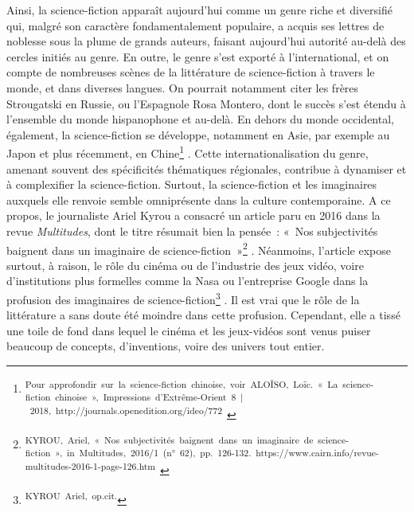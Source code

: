 \documentclass[letterpaper,portrait,12pt]{article}
\begin{document}
	Ainsi, la science-fiction appara\^{i}t aujourd'hui comme un genre riche et diversifi\'{e} qui, malgr\'{e} son caract\`{e}re fondamentalement populaire, a acquis ses lettres de noblesse sous la plume de grands auteurs, faisant aujourd'hui autorit\'{e} au-del\`{a} des cercles initi\'{e}s au genre. En outre, le genre s'est export\'{e} \`{a} l'international, et on compte de nombreuses sc\`{e}nes de la litt\'{e}rature de science-fiction \`{a} travers le monde, et dans diverses langues. On pourrait notamment citer les fr\`{e}res Strougatski en Russie, ou l'Espagnole Rosa Montero, dont le succ\`{e}s s'est \'{e}tendu \`{a} l'ensemble du monde hispanophone et au-del\`{a}. En dehors du monde occidental, \'{e}galement, la science-fiction se d\'{e}veloppe, notamment en Asie, par exemple au Japon et plus r\'{e}cemment, en Chine\footnote{\textsuperscript{\newpage
}\textsuperscript{	Pour\ approfondir\ sur\ la\ science-fiction\ chinoise,\ voir\ ALOÏSO,\ Loïc.\ «\ La\ science-fiction\ chinoise\ »,\ Impressions\ d'Extr\^{e}me-Orient\ 8\ |\ 2018,\ http://journals.openedition.org/ideo/772\ }} . Cette internationalisation du genre, amenant souvent des sp\'{e}cificit\'{e}s th\'{e}matiques r\'{e}gionales, contribue \`{a} dynamiser et \`{a} complexifier la science-fiction. Surtout, la science-fiction et les imaginaires auxquels elle renvoie semble omnipr\'{e}sente dans la culture contemporaine. A ce propos, le journaliste Ariel Kyrou a consacr\'{e} un article paru en 2016 dans la revue \emph{Multitudes}, dont le titre r\'{e}sumait bien la pens\'{e}e : « Nos subjectivit\'{e}s baignent dans un imaginaire de science-fiction »\footnote{\textsuperscript{\newpage
}\textsuperscript{	KYROU,\ Ariel,\ «\ Nos\ subjectivit\'{e}s\ baignent\ dans\ un\ imaginaire\ de\ science-fiction\ »,\ in\ Multitudes,\ 2016/1\ (n°\ 62),\ pp.\ 126-132.\ https://www.cairn.info/revue-multitudes-2016-1-page-126.htm\ }} . N\'{e}anmoins, l'article expose surtout, \`{a} raison, le r\^{o}le du cin\'{e}ma ou de l'industrie des jeux vid\'{e}o, voire d'institutions plus formelles comme la Nasa ou l'entreprise Google dans la profusion des imaginaires de science-fiction\footnote{\textsuperscript{\newpage
}\textsuperscript{	KYROU\ Ariel,\ op.cit.}} . Il est vrai que le r\^{o}le de la litt\'{e}rature a sans doute \'{e}t\'{e} moindre dans cette profusion. Cependant, elle a tiss\'{e} une toile de fond dans lequel le cin\'{e}ma et les jeux-vid\'{e}os sont venus puiser beaucoup de concepts, d'inventions, voire des univers tout entier. 
\end{document}
